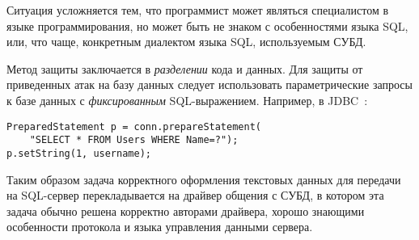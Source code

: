 Ситуация усложняется тем, что программист может являться специалистом в языке программирования, но может быть не знаком с особенностями языка SQL, или, что чаще, конкретным диалектом языка SQL, используемым СУБД.

Метод защиты заключается в \emph{разделении} кода и данных. Для защиты от приведенных атак на базу данных следует использовать параметрические запросы к базе данных с \emph{фиксированным} SQL-выражением. Например, в JDBC~\cite{jdbc:2006}:
\begin{verbatim}
PreparedStatement p = conn.prepareStatement(
    "SELECT * FROM Users WHERE Name=?");
p.setString(1, username);
\end{verbatim}

Таким образом задача корректного оформления текстовых данных для передачи на SQL-сервер перекладывается на драйвер общения с СУБД, в котором эта задача обычно решена корректно авторами драйвера, хорошо знающими особенности протокола и языка управления данными сервера.
